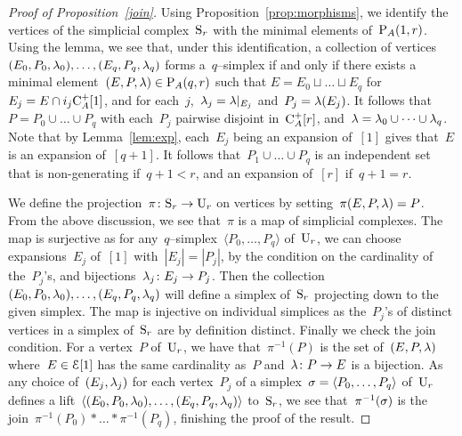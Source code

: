 \begin{proof}[Proof of Proposition~\ref{join}]
Using Proposition~\ref{prop:morphisms}, we identify the vertices of the simplicial complex~$\mathrm{S}_r$ with the minimal
elements of~$\mathrm{P}_A(1,r)$. Using  the lemma, we see that, under this identification,  a collection of vertices~$(E_0,P_0,\lambda_0),\dots,(E_q,P_q,\lambda_q)$ forms a~$q$--simplex if and only if there exists a minimal element~\hbox{$(E,P,\lambda)\in \mathrm{P}_A(q,r)$} 
such that 
$E=E_0\sqcup\dots\sqcup E_q$ for~$E_j=E\cap i_j\mathrm{C}_A^+[1]$,  and for each~$j$,~$\lambda_j=\lambda|_{E_j}$ and~$P_j=\lambda(E_j)$. 
It follows that~$P=P_0\cup\dots\cup P_q$ with each~$P_j$ pairwise disjoint in~$\mathrm{C}_A^+[r]$, and~$\lambda=\lambda_0\cup \dots\cup \lambda_q$. 
Note that by Lemma~\ref{lem:exp}, each~$E_j$ being an expansion of~$[1]$ gives that~$E$ is an expansion of~$[q+1]$.  
It follows that~$P_1\cup\dots\cup P_q$ is an independent set that is  non-generating if~$q+1<r$, and an expansion of~$[r]$ if~$q+1=r$.  

We define the projection~$\pi\colon\mathrm{S}_r\to\mathrm{U}_r$ on vertices by setting~$\pi(E,P,\lambda)=P$. From the above discussion, we see that~$\pi$ is a map of simplicial complexes. 
The map is surjective as for any~$q$--simplex~$\langle P_0,\dots,P_q\rangle$ of~$\mathrm{U}_r$, we can choose expansions~$E_j$ of~$[1]$ with~$|E_j|=|P_j|$, by the condition on the cardinality of the~$P_j$'s, and bijections~$\lambda_j\colon E_j\to P_j$. Then the collection~$(E_0,P_0,\lambda_0),\dots,(E_q,P_q,\lambda_q)$ will define a simplex of~$\mathrm{S}_r$ projecting down to the given simplex. The map is injective on individual simplices as the~$P_j$'s of distinct vertices in a simplex of~$\mathrm{S}_r$ are by definition distinct. Finally we check the join condition. For a vertex~$P$ of~$\mathrm{U}_r$, we have that~$\pi^{-1}(P)$ is the set of~$(E,P,\lambda)$ where~$E\in \mathcal{E}[1]$ has the same cardinality as~$P$ and~$\lambda\colon P\to E$ is a bijection. As any choice of~$(E_j,\lambda_j)$ for each vertex~$P_j$ of a simplex~$\sigma=\langle P_0,\dots,P_q\rangle$ of~$\mathrm{U}_r$ defines a lift~$\langle (E_0,P_0,\lambda_0),\dots,(E_q,P_q,\lambda_q)\rangle$ to~$\mathrm{S}_r$, we see that~$\pi^{-1}(\sigma)$ is the join~$\pi^{-1}(P_0)*\dots*\pi^{-1}(P_q)$, finishing the proof of the result. 
\end{proof}

